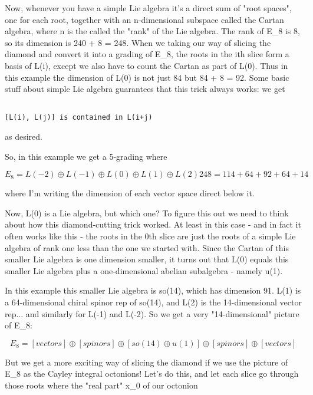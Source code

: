 Now, whenever you have a simple Lie algebra it's a direct sum of
"root spaces", one for each root, together with an
n-dimensional subspace called the Cartan algebra, where n is the called
the "rank" of the Lie algebra.  The rank of E_{8} is 8, so its
dimension is 240 + 8 = 248.  When we taking our way of slicing the
diamond and convert it into a grading of E_{8}, the roots in the ith slice
form a basis of L(i), except we also have to count the Cartan as part of
L(0).  Thus in this example the dimension of L(0) is not just 84 but 84
+ 8 = 92.  Some basic stuff about simple Lie algebra guarantees that
this trick always works: we get


\begin{verbatim}

[L(i), L(j)] is contained in L(i+j)
\end{verbatim}
    
as desired.  

So, in this example we get a 5-grading where


$$

E_{8} =  L(-2) \oplus  L(-1) \oplus  L(0) \oplus  L(1) \oplus  L(2)
248 =  114  +  64   +  92   +  64  +  14
$$
    
where I'm writing the dimension of each vector space direct below it.

Now, L(0) is a Lie algebra, but which one?  To figure this out we need
to think about how this diamond-cutting trick worked.  At least in this
case - and in fact it often works like this - the roots in the 0th slice
are just the roots of a simple Lie algebra of rank one less than the one
we started with.  Since the Cartan of this smaller Lie algebra is one
dimension smaller, it turns out that L(0) equals this smaller Lie
algebra plus a one-dimensional abelian subalgebra - namely u(1).

In this example this smaller Lie algebra is so(14), which has dimension
91.  L(1) is a 64-dimensional chiral spinor rep of so(14), and L(2) is
the 14-dimensional vector rep... and similarly for L(-1) and L(-2).  
So we get a very "14-dimensional" picture of E_{8}:


$$

E_{8} =  [vectors] \oplus  [spinors] \oplus  [so(14) \oplus  u(1)] \oplus  [spinors] \oplus  [vectors]
$$
    

But we get a more exciting way of slicing the diamond if we use the
picture of E_{8} as the Cayley integral octonions!  Let's do this, and let
each slice go through those roots where the "real part"
x_{0} of our octonion


